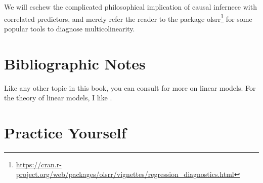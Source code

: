 \documentclass[]{book}
\renewcommand{\href}[2]{#2\footnote{\url{#1}}}
\theoremstyle{definition}
\theoremstyle{definition}
\theoremstyle{definition}
\theoremstyle{remark}
\begin{document}
We will eschew the complicated philosophical implication of causal infernece with correlated predictors, and merely refer the reader to the package \href{https://cran.r-project.org/web/packages/olsrr/vignettes/regression_diagnostics.html}{olsrr} for some popular tools to diagnose multicolinearity.

\hypertarget{bibliographic-notes-4}{%
\section{Bibliographic Notes}\label{bibliographic-notes-4}}

Like any other topic in this book, you can consult \citet{venables2013modern} for more on linear models.
For the theory of linear models, I like \citet{greene2003econometric}.

\hypertarget{practice-yourself-3}{%
\section{Practice Yourself}\label{practice-yourself-3}}
\end{document}
